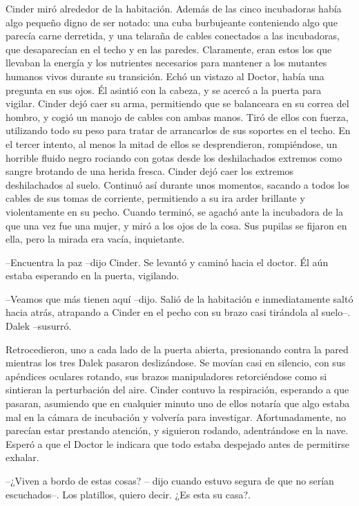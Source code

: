 Cinder miró alrededor de la habitación. Además de las cinco incubadoras había algo pequeño digno de ser notado: una cuba burbujeante conteniendo algo que parecía carne derretida, y una telaraña de cables conectados a las incubadoras, que desaparecían en el techo y en las paredes. Claramente, eran estos los que llevaban la energía y los nutrientes necesarios para mantener a los mutantes humanos vivos durante su transición.
Echó un vistazo al Doctor, había una pregunta en sus ojos. Él asintió con la cabeza, y se acercó a la puerta para vigilar.
Cinder dejó caer su arma, permitiendo que se balanceara en su correa del hombro, y cogió un manojo de cables con ambas manos. Tiró de ellos con fuerza, utilizando todo su peso para tratar de arrancarlos de sus soportes en el techo. En el tercer intento, al menos la mitad de ellos se desprendieron, rompiéndose, un horrible fluido negro rociando con gotas desde los deshilachados extremos como sangre brotando de una herida fresca. Cinder dejó caer los extremos deshilachados al suelo. Continuó así durante unos momentos, sacando a todos los cables de sus tomas de corriente, permitiendo a su ira arder brillante y violentamente en su pecho.
Cuando terminó, se agachó ante la incubadora de la que una vez fue una mujer, y miró a los ojos de la cosa. Sus pupilas se fijaron en ella, pero la mirada era vacía, inquietante. 

--Encuentra la paz --dijo Cinder. Se levantó y caminó hacia el doctor. Él aún estaba esperando en la puerta, vigilando.

--Veamos que más tienen aquí --dijo. Salió de la habitación e inmediatamente saltó hacia atrás, atrapando a Cinder en el pecho con su brazo casi tirándola al suelo--. Dalek --susurró.

Retrocedieron, uno a cada lado de la puerta abierta, presionando contra la pared mientras los tres Dalek pasaron deslizándose. Se movían casi en silencio, con sus apéndices oculares rotando, sus brazos manipuladores retorciéndose como si sintieran la perturbación del aire.
Cinder contuvo la respiración, esperando a que pasaran, asumiendo que en cualquier minuto uno de ellos notaría que algo estaba mal en la cámara de incubación y volvería para investigar.
Afortunadamente, no parecían estar prestando atención, y siguieron rodando, adentrándose en la nave.
Esperó a que el Doctor le indicara que todo estaba despejado antes de permitirse exhalar. 

--¿Viven a bordo de estas cosas? -- dijo cuando estuvo segura de que no serían escuchados--. Los platillos, quiero decir. ¿Es esta su casa?.


